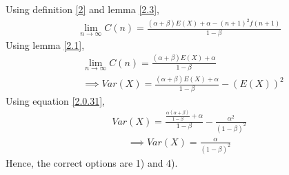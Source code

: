 \documentclass[journal,12pt,twocolumn]{IEEEtran}
\begin{document}
Using definition \eqref{2} and lemma \eqref{2.3},
\begin{align}
    \lim_{n\to\infty}C(n)=\frac{(\alpha+\beta)E(X)+\alpha-(n+1)^2f(n+1)}{1-\beta}
\end{align}
Using lemma \eqref{2.1},
\begin{align}
    &\lim_{n\to\infty}C(n)=\frac{(\alpha+\beta)E(X)+\alpha}{1-\beta}\\
    &\implies Var(X)=\frac{(\alpha+\beta)E(X)+\alpha}{1-\beta}-(E(X))^2
\end{align}
Using equation \eqref{2.0.31},
\begin{align}
    Var(X)=\frac{\frac{\alpha(\alpha+\beta)}{1-\beta}+\alpha}{1-\beta}-\frac{\alpha^2}{(1-\beta)^2}
\end{align}
\begin{align}
    \boxed{\implies Var(X)=\frac{\alpha}{(1-\beta)^2}}
\end{align}
Hence, the correct options are 1) and 4).
\end{document}
